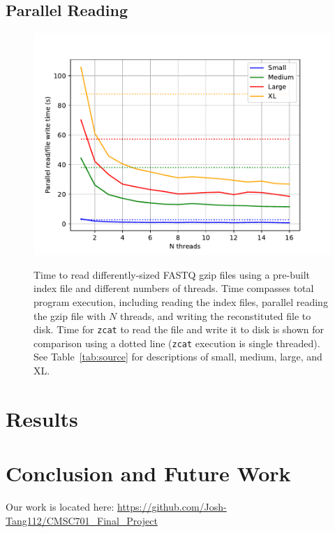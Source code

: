 \documentclass[unnumsec,webpdf,contemporary,large]{oup-authoring-template}
\newcommand{\gzip}{gzip\xspace}
\begin{document}
\subsection{Parallel Reading}


\begin{figure}
    \includegraphics[width=\linewidth]{figs/cores.pdf}
    \label{fig:cores}
    \caption{Time to read differently-sized FASTQ \gzip files using a pre-built
    index file and different numbers of threads. Time compasses total program
    execution, including reading the index files, parallel reading the \gzip
    file with $N$ threads, and writing the reconstituted file to disk. Time for
    \texttt{zcat} to read the file and write it to disk is shown for comparison
    using a dotted line (\texttt{zcat} execution is single threaded). See
    Table~\ref{tab:source} for descriptions of small, medium, large, and XL.}
\end{figure}


\section{Results}

\section{Conclusion and Future Work}

Our work is located here:
\url{https://github.com/Josh-Tang112/CMSC701_Final_Project}



\end{document}
